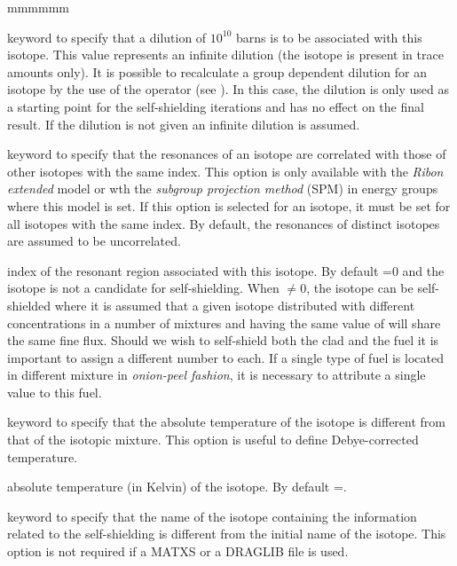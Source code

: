 \begin{ListeDeDescription}{mmmmmm}
\item[\moc{INF}] keyword to specify that a dilution of $10^{10}$ barns is to
be associated with this isotope. This value represents an infinite dilution (the
isotope is present in trace amounts only). It is possible to
recalculate a group dependent dilution for an isotope by the use of the
 operator (see ). In this case, the dilution is only used
as a starting point for the self-shielding iterations and has no effect on the
final result. If the dilution is not given an infinite dilution is assumed.

\item[\moc{CORR}] keyword to specify that the resonances of an isotope are correlated
with those of other isotopes with the same  index. This option is only
available with the {\sl Ribon extended} model\cite{nse2004} or wth the {\sl subgroup
projection method} (SPM)\cite{SPM09}  in energy groups where
this model is set. If this option is selected for
an isotope, it must be set for all isotopes with the same  index. By default,
the resonances of distinct isotopes are assumed to be uncorrelated.

\item[\dusa{inrs}] index of the resonant region associated with this isotope.
By default =0 and the isotope is not a candidate for self-shielding.
When $\ne$0, the isotope can be self-shielded where it is assumed that a given
isotope distributed with different concentrations in a number of mixtures and
having the same value of  will share the same fine flux. 
Should we wish to self-shield both the clad and the fuel it is important
to assign a different  number
to each. If a single type of fuel is located in different mixture in
{\sl onion-peel fashion}, it is necessary to attribute a single  value
to this fuel.

\item[\moc{DBYE}] keyword to specify that the absolute temperature of the
isotope is different from that of the isotopic mixture. This option is useful to
define Debye-corrected temperature.

\item[\dusa{tempd}] absolute temperature (in Kelvin) of the isotope. By
default =.

\item[\moc{SHIB}] keyword to specify that the name of the isotope containing
the information related to the self-shielding is different from the initial name
of the isotope. This option is not required if a MATXS or a DRAGLIB file is used.


\end{ListeDeDescription}
